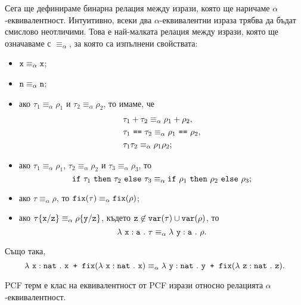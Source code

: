 Сега ще дефинираме бинарна релация между изрази, която ще наричаме $\alpha$-еквивалентност.
Интуитивно, всеки два $\alpha$-еквивалентни израза трябва да бъдат смислово неотличими.
Това е най-малката релация между изрази, която ще означаваме с $\equiv_\alpha$, за която са изпълнени свойствата:
\begin{itemize}
\item
  $\texttt{x} \equiv_\alpha \texttt{x}$;
\item
  $\texttt{n} \equiv_\alpha \texttt{n}$;
\item
  ако $\tau_1 \equiv_\alpha \rho_1$ и $\tau_2 \equiv_\alpha \rho_2$, то имаме, че
  \begin{align*}
    & \tau_1 + \tau_2 \equiv_\alpha \rho_1 + \rho_2,\\
    & \tau_1\ \vv{==}\ \tau_2 \equiv_\alpha \rho_1\ \vv{==}\ \rho_2,\\
    & \tau_1 \tau_2 \equiv_\alpha \rho_1 \rho_2;
  \end{align*}
\item
  ако $\tau_1 \equiv_\alpha \rho_1$, $\tau_2 \equiv_\alpha \rho_2$ и $\tau_3 \equiv_\alpha \rho_3$, то
  \[\texttt{if}\ \tau_1\ \texttt{then}\ \tau_2\ \texttt{else}\ \tau_3 \equiv_\alpha \texttt{if}\ \rho_1\ \texttt{then}\ \rho_2\ \texttt{else}\ \rho_3;\]
\item
  ако $\tau \equiv_\alpha \rho$, то $\texttt{fix}(\tau) \equiv_\alpha \texttt{fix}(\rho)$;
\item  
  ако $\tau\{\texttt{x}/{\texttt{z}}\} \equiv_\alpha \rho\{\texttt{y}/{\texttt{z}}\}$, където $\texttt{z} \not\in \texttt{var}(\tau) \cup \texttt{var}(\rho)$, то
  \[\lambda~\texttt{x}:\texttt{a}~.~{\tau} \equiv_\alpha \lambda~\texttt{y}:\texttt{a}~.~{\rho}.\]
\end{itemize}

Също така,
\[\lambda~\texttt{x}:\texttt{nat}~.~{\texttt{x + }\texttt{fix}(\lambda~\texttt{x}:\texttt{nat}~.~{\texttt{x}})} \equiv_\alpha \lambda~\texttt{y}:\texttt{nat}~.~{\texttt{y + }\texttt{fix}(\lambda~\texttt{z}:\texttt{nat}~.~{\texttt{z}})}.\]

\begin{framed}
\begin{definition}
  PCF терм е клас на еквивалентност от PCF изрази относно релацията $\alpha$-еквивалентност.
\end{definition}
\end{framed}

